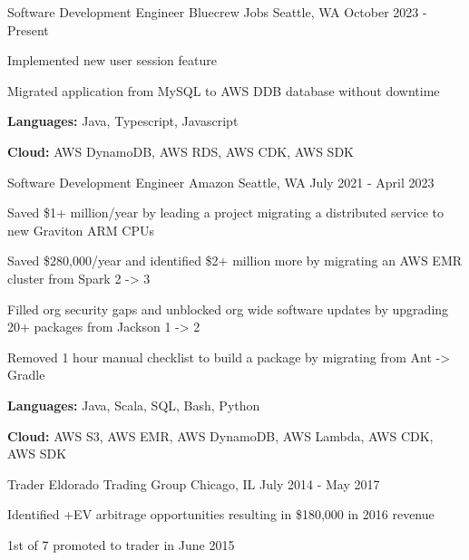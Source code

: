 

\begin{cventries}

  \cventry
    {Software Development Engineer} %
    {Bluecrew Jobs} %
    {Seattle, WA} %
    {October 2023 - Present} %
    {
      \begin{cvitems} %
        \item {Implemented new user session feature}
        \item {Migrated application from MySQL to AWS DDB database without downtime}
        \item {\textbf{Languages:} Java, Typescript, Javascript}
        \item {\textbf{Cloud:} AWS DynamoDB, AWS RDS, AWS CDK, AWS SDK}
      \end{cvitems}
    }

  \cventry
    {Software Development Engineer} %
    {Amazon} %
    {Seattle, WA} %
    {July 2021 - April 2023} %
    {
      \begin{cvitems} %
        \item {Saved \$1+ million/year by leading a project migrating a distributed service to new Graviton ARM CPUs}
        \item {Saved \$280,000/year and identified \$2+ million more by migrating an AWS EMR cluster from Spark 2 -> 3}
        \item {Filled org security gaps and unblocked org wide software updates by upgrading 20+ packages from Jackson 1 -> 2}
        \item {Removed 1 hour manual checklist to build a package by migrating from Ant -> Gradle}
        \item {\textbf{Languages:} Java, Scala, SQL, Bash, Python}
        \item {\textbf{Cloud:} AWS S3, AWS EMR, AWS DynamoDB, AWS Lambda, AWS CDK, AWS SDK}
      \end{cvitems}
    }

  \cventry
    {Trader} %
    {Eldorado Trading Group} %
    {Chicago, IL} %
    {July 2014 - May 2017} %
    {
      \begin{cvitems} %
        \item {Identified +EV arbitrage opportunities resulting in \$180,000 in 2016 revenue}
        \item {1st of 7 promoted to trader in June 2015}
      \end{cvitems}
    }

\end{cventries}
